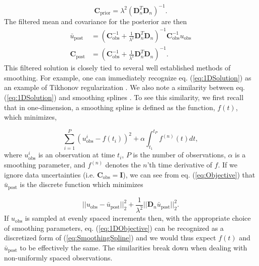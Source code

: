 \documentclass[10pt,a4paper]{article}
\begin{document}
\begin{equation}\label{eq:ExplicitPrior1D}
\mathbf{C_\mathrm{prior}} = \lambda^2(\mathbf{D}_n^T\mathbf{D}_n)^{-1}.
\end{equation}
The filtered mean and covariance for the posterior are then 
\begin{equation}\label{eq:1DSolution}
\begin{split}
\bar{u}_\mathrm{post} &= (\mathbf{C}_\mathrm{obs}^{-1} +   
                   \frac{1}{\lambda^2}\mathbf{D}_n^T\mathbf{D}_n)^{-1}\mathbf{C}_\mathrm{obs}^{-1}
                   u_\mathrm{obs}
\\
\mathbf{C}_\mathrm{post} &= (\mathbf{C}_\mathrm{obs}^{-1} +   
                            \frac{1}{\lambda^2}\mathbf{D}_n^T\mathbf{D}_n)^{-1}.
\end{split}
\end{equation}
This filtered solution is closely tied to several well established methods of smoothing.  For example, one can immediately recognize eq. (\ref{eq:1DSolution}) as an example of Tikhonov regularization \citep{Tikhonov1978}. We also note a similarity between eq. (\ref{eq:1DSolution}) and smoothing splines \citep{Wahba1990}.  To see this similarity, we first recall that in one-dimension, a smoothing spline is defined as the function, $f(t)$, which minimizes,

\begin{equation}\label{eq:SmoothingSpline}
\sum_{i=1}^P (u_\mathrm{obs}^i - f(t_i))^2 + \alpha \int_{t_1}^{t_P} f^{(n)}(t) dt,
\end{equation}
where $u_\mathrm{obs}^i$ is an observation at time $t_i$, $P$ is the number of observations, $\alpha$ is a smoothing parameter, and $f^{(n)}$ denotes the $n$'th time derivative of $f$.
If we ignore data uncertainties (i.e. $\mathbf{C}_\mathrm{obs}=\mathbf{I}$), we can see from eq. (\ref{eq:Objective}) that $\bar{u}_\mathrm{post}$ is the discrete function which minimizes  

\begin{equation}\label{eq:1DObjective}
||u_\mathrm{obs} - \bar{u}_\mathrm{post}||_2^2 + \frac{1}{\lambda^2}||\mathbf{D}_n\bar{u}_\mathrm{post}||_2^2.
\end{equation} 
If $u_\mathrm{obs}$ is sampled at evenly spaced increments then, with the appropriate choice of smoothing parameters, eq. (\ref{eq:1DObjective}) can be recognized as a discretized form of (\ref{eq:SmoothingSpline}) and we would thus expect $f(t)$ and $\bar{u}_\mathrm{post}$ to be effectively the same. The similarities break down when dealing with non-uniformly spaced observations.  
\end{document}

